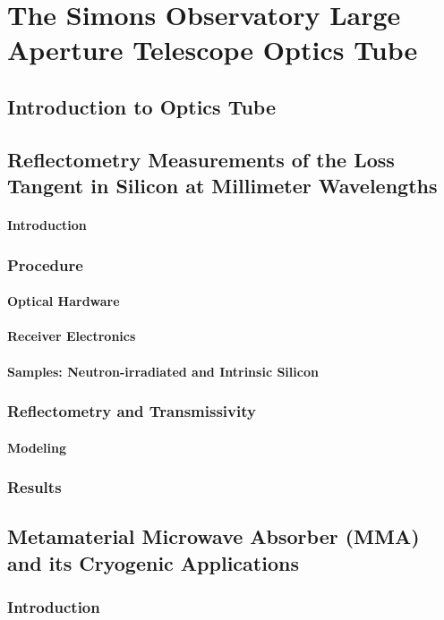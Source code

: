 \chapter{The Simons Observatory Large Aperture Telescope Optics Tube}
\section{Introduction to Optics Tube}

\section{Reflectometry Measurements of the Loss Tangent in Silicon at Millimeter Wavelengths}
\subsubsection{Introduction}
\subsection{Procedure}
\subsubsection{Optical Hardware}
\subsubsection{Receiver Electronics}
\subsubsection{Samples: Neutron-irradiated and Intrinsic Silicon}
\subsection{Reflectometry and Transmissivity}
\subsubsection{Modeling}
\subsection{Results}


\section{Metamaterial Microwave Absorber (MMA) and its Cryogenic Applications}
\subsection{Introduction}
